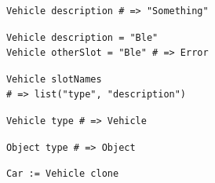 \begin{frame}[fragile]
  \begin{center}
    \begin{lstlisting}
      Vehicle description # => "Something"
    \end{lstlisting}
  \end{center}
\end{frame}
  
\begin{frame}[fragile]
  \begin{center}
    \begin{lstlisting}
      Vehicle description = "Ble"
      Vehicle otherSlot = "Ble" # => Error
    \end{lstlisting}
    \end{center}
\end{frame}  
 
\begin{frame}[fragile]
  \begin{center}
    \begin{lstlisting}
      Vehicle slotNames 
      # => list("type", "description")
    \end{lstlisting}
  \end{center}
\end{frame}
  
\begin{frame}[fragile]
  \begin{center}
    \begin{lstlisting}
      Vehicle type # => Vehicle
    \end{lstlisting}
  \end{center}
\end{frame}

\begin{frame}[fragile]
  \begin{center}
    \begin{lstlisting}
      Object type # => Object
    \end{lstlisting}
  \end{center}
\end{frame}  

\begin{frame}[fragile]
  \begin{center}
    \begin{lstlisting}
      Car := Vehicle clone
    \end{lstlisting}
  \end{center}
\end{frame}  


